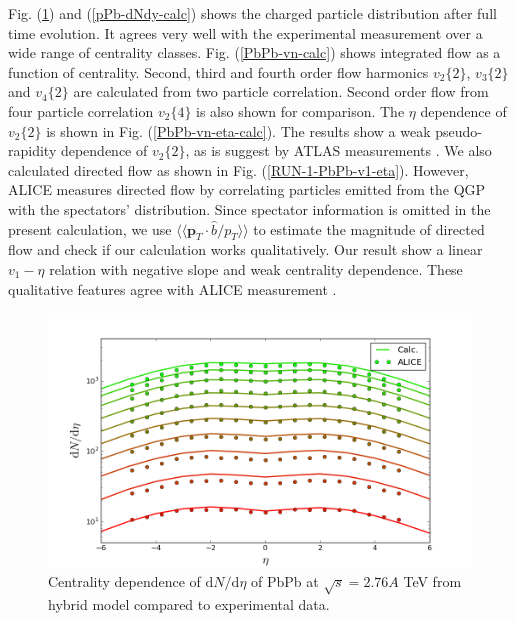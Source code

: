 \documentclass[aps,prl,twocolumn,groupedaddress]{revtex4-1}
\begin{document}
	Fig. (\ref{PbPb-dNdy-calc}) and  (\ref{pPb-dNdy-calc}) shows the charged particle distribution after full time evolution. 
	It agrees very well with the experimental measurement over a wide range of centrality classes. 
	Fig. (\ref{PbPb-vn-calc}) shows integrated flow as a function of centrality. 
	Second, third and fourth order flow harmonics $v_2\{2\}$, $v_3\{2\}$ and $v_4\{2\}$ are calculated from two particle correlation. Second order flow from four particle correlation $v_2\{4\}$ is also shown for comparison.
	The $\eta$ dependence of $v_2\{2\}$ is shown in Fig. (\ref{PbPb-vn-eta-calc}). The results show a weak pseudo-rapidity dependence of $v_2\{2\}$, as is suggest by ATLAS measurements \citep{ATLAS:2014eoa}.
	We also calculated directed flow as shown in Fig. (\ref{RUN-1-PbPb-v1-eta}). 
	However, ALICE measures directed flow by correlating particles emitted from the QGP with the spectators' distribution.
	Since spectator information is omitted in the present calculation, we use $\langle\langle \mathbf{p}_T\cdot \hat{b}/p_T\rangle\rangle$ to estimate the magnitude of directed flow and check if our calculation works qualitatively.
	Our result show a linear $v_1-\eta$ relation with negative slope and weak centrality dependence.
	These qualitative features agree with ALICE measurement \citep{Abelev:2013cva}.
	\begin{figure}
  	\centering
	\includegraphics[width=\columnwidth]{pics/RUN-1-PbPb-dNdy-eta.png}
  	\caption{Centrality dependence of $\mathrm{d}N/\mathrm{d}\eta$ of PbPb at $\sqrt{s} = 2.76 A$ TeV from hybrid model compared to experimental data.}
  	\label{PbPb-dNdy-calc}
	\end{figure}
	
\end{document}
